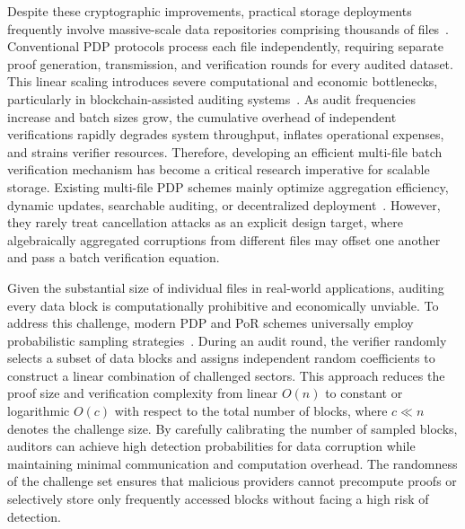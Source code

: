 \documentclass[lettersize,journal]{IEEEtran}
\begin{document}
Despite these cryptographic improvements, practical storage deployments frequently involve massive-scale data repositories comprising thousands of files~\cite{ZhangTPDS23,XuTIFS26}. Conventional PDP protocols process each file independently, requiring separate proof generation, transmission, and verification rounds for every audited dataset. This linear scaling introduces severe computational and economic bottlenecks, particularly in blockchain-assisted auditing systems~\cite{Shu2022BlockchainAudit,Cui2024PayPerProof,Xu2024BDACD}. As audit frequencies increase and batch sizes grow, the cumulative overhead of independent verifications rapidly degrades system throughput, inflates operational expenses, and strains verifier resources. Therefore, developing an efficient multi-file batch verification mechanism has become a critical research imperative for scalable storage. Existing multi-file PDP schemes mainly optimize aggregation efficiency, dynamic updates, searchable auditing, or decentralized deployment~\cite{XuTIFS26,ZhangTPDS23,MiaoSCIS2026}. However, they rarely treat cancellation attacks as an explicit design target, where algebraically aggregated corruptions from different files may offset one another and pass a batch verification equation.


Given the substantial size of individual files in real-world applications, auditing every data block is computationally prohibitive and economically unviable. To address this challenge, modern PDP and PoR schemes universally employ probabilistic sampling strategies~\cite{Ateniese2008Scalable,Shacham2008POR,Dodis2009POR,Le2023Porla}. During an audit round, the verifier randomly selects a subset of data blocks and assigns independent random coefficients to construct a linear combination of challenged sectors. This approach reduces the proof size and verification complexity from linear $O(n)$ to constant or logarithmic $O(c)$ with respect to the total number of blocks, where $c \ll n$ denotes the challenge size. By carefully calibrating the number of sampled blocks, auditors can achieve high detection probabilities for data corruption while maintaining minimal communication and computation overhead. The randomness of the challenge set ensures that malicious providers cannot precompute proofs or selectively store only frequently accessed blocks without facing a high risk of detection.
\end{document}

